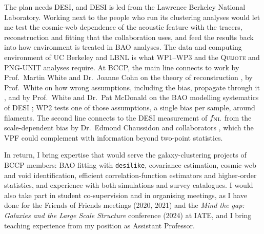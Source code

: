 \documentclass[11pt,a4paper]{article}
\newcommand{\desilike}{\texttt{desilike}}
\begin{document}
The plan needs DESI, and DESI is led from the Lawrence Berkeley National Laboratory. Working next to the people who run its clustering analyses would let me test the cosmic-web dependence of the acoustic feature with the tracers, reconstruction and fitting that the collaboration uses, and feed the results back into how environment is treated in BAO analyses. The data and computing environment of UC Berkeley and LBNL is what WP1--WP3 and the \textsc{Quijote} and PNG-UNIT analyses require.
At BCCP, the main line connects to work by Prof.~Martin White and Dr.~Joanne Cohn on the theory of reconstruction \citep{Padmanabhan2009}, by Prof.~White on how wrong assumptions, including the bias, propagate through it \citep{Sherwin2019}, and by Prof.~White and Dr.~Pat McDonald on the BAO modelling systematics of DESI \citep{Chen2024}; WP2 tests one of those assumptions, a single bias per sample, around filaments. The second line connects to the DESI measurement of $f_{\rm NL}$ from the scale-dependent bias by Dr.~Edmond Chaussidon and collaborators \citep{Chaussidon2025}, which the VPF could complement with information beyond two-point statistics.

In return, I bring expertise that would serve the galaxy-clustering projects of BCCP members: BAO fitting with \desilike, covariance estimation, cosmic-web and void identification, efficient correlation-function estimators and higher-order statistics, and experience with both simulations and survey catalogues. I would also take part in student co-supervision and in organising meetings, as I have done for the Friends of Friends meetings (2020, 2021) and the \textit{Mind the gap: Galaxies and the Large Scale Structure} conference (2024) at IATE, and I bring teaching experience from my position as Assistant Professor.
\end{document}
